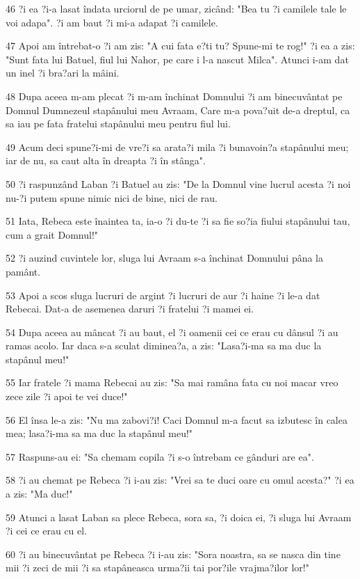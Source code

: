 \par 46 ?i ea ?i-a lasat îndata urciorul de pe umar, zicând: "Bea tu ?i camilele tale le voi adapa". ?i am baut ?i mi-a adapat ?i camilele.
\par 47 Apoi am întrebat-o ?i am zis: "A cui fata e?ti tu? Spune-mi te rog!" ?i ea a zis: "Sunt fata lui Batuel, fiul lui Nahor, pe care i l-a nascut Milca". Atunci i-am dat un inel ?i bra?ari la mâini.
\par 48 Dupa aceea m-am plecat ?i m-am închinat Domnului ?i am binecuvântat pe Domnul Dumnezeul stapânului meu Avraam, Care m-a pova?uit de-a dreptul, ca sa iau pe fata fratelui stapânului meu pentru fiul lui.
\par 49 Acum deci spune?i-mi de vre?i sa arata?i mila ?i bunavoin?a stapânului meu; iar de nu, sa caut alta în dreapta ?i în stânga".
\par 50 ?i raspunzând Laban ?i Batuel au zis: "De la Domnul vine lucrul acesta ?i noi nu-?i putem spune nimic nici de bine, nici de rau.
\par 51 Iata, Rebeca este înaintea ta, ia-o ?i du-te ?i sa fie so?ia fiului stapânului tau, cum a grait Domnul!"
\par 52 ?i auzind cuvintele lor, sluga lui Avraam s-a închinat Domnului pâna la pamânt.
\par 53 Apoi a scos sluga lucruri de argint ?i lucruri de aur ?i haine ?i le-a dat Rebecai. Dat-a de asemenea daruri ?i fratelui ?i mamei ei.
\par 54 Dupa aceea au mâncat ?i au baut, el ?i oamenii cei ce erau cu dânsul ?i au ramas acolo. Iar daca s-a sculat diminea?a, a zis: "Lasa?i-ma sa ma duc la stapânul meu!"
\par 55 Iar fratele ?i mama Rebecai au zis: "Sa mai ramâna fata cu noi macar vreo zece zile ?i apoi te vei duce!"
\par 56 El însa le-a zis: "Nu ma zabovi?i! Caci Domnul m-a facut sa izbutesc în calea mea; lasa?i-ma sa ma duc la stapânul meu!"
\par 57 Raspuns-au ei: "Sa chemam copila ?i s-o întrebam ce gânduri are ea".
\par 58 ?i au chemat pe Rebeca ?i i-au zis: "Vrei sa te duci oare cu omul acesta?" ?i ea a zis: "Ma duc!"
\par 59 Atunci a lasat Laban sa plece Rebeca, sora sa, ?i doica ei, ?i sluga lui Avraam ?i cei ce erau cu el.
\par 60 ?i au binecuvântat pe Rebeca ?i i-au zis: "Sora noastra, sa se nasca din tine mii ?i zeci de mii ?i sa stapâneasca urma?ii tai por?ile vrajma?ilor lor!"
